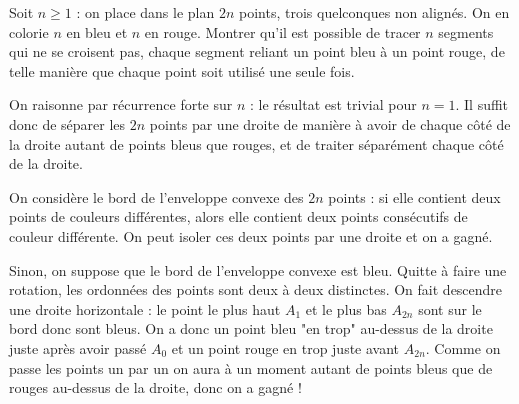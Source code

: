 %
%

\begin{exo}
Soit $n \geq 1$ : on place dans le plan $2n$ points, trois quelconques non alignés. On en colorie $n$ en bleu et $n$ en rouge. Montrer qu'il est possible de tracer $n$ segments qui ne se croisent pas, chaque segment reliant un point bleu à un point rouge, de telle manière que chaque point soit utilisé une seule fois.
\end{exo}

\begin{sol}
On raisonne par récurrence forte sur $n$ : le résultat est trivial pour $n=1$. Il suffit donc de séparer les $2n$ points par une droite de manière à avoir de chaque côté de la droite autant de points bleus que rouges, et de traiter séparément chaque côté de la droite.

On considère le bord de l'enveloppe convexe des $2n$ points : si elle contient deux points de couleurs différentes, alors elle contient deux points consécutifs de couleur différente. On peut isoler ces deux points par une droite et on a gagné. 

Sinon, on suppose que le bord de l'enveloppe convexe est bleu. Quitte à faire une rotation, les ordonnées des points sont deux à deux distinctes. On fait descendre une droite horizontale : le point le plus haut $A_1$ et le plus bas $A_{2n}$ sont sur le bord donc sont bleus. On a donc un point bleu "en trop" au-dessus de la droite juste après avoir passé $A_0$ et un point rouge en trop juste avant $A_{2n}$. Comme on passe les points un par un on aura à un moment autant de points bleus que de rouges au-dessus de la droite, donc on a gagné !
\end{sol}

